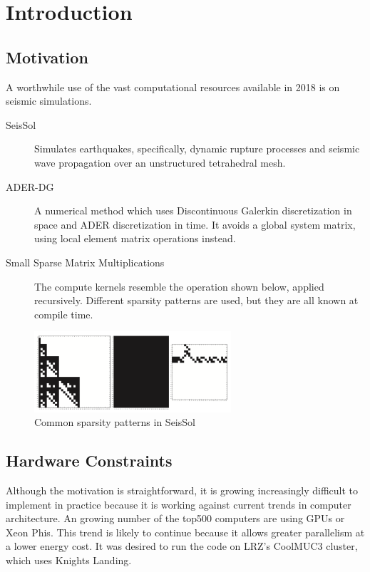 \chapter{Introduction}
\label{chapter:Introduction}


\section{Motivation}

A worthwhile use of the vast computational resources available in 2018 is on seismic simulations. 

\begin{description}
	\item[SeisSol]
    Simulates earthquakes, specifically, dynamic rupture processes and seismic wave propagation over an unstructured tetrahedral mesh. 

    \item[ADER-DG]
    A numerical method which uses Discontinuous Galerkin discretization in space and ADER discretization in time. It avoids a global system matrix, using local element matrix operations instead.

    \item[Small Sparse Matrix Multiplications]
    The compute kernels resemble the operation shown below, applied recursively. Different sparsity patterns are used, but they are all known at compile time.
\end{description}

\begin{figure}
  \centering
  \includegraphics[height=3cm]{images/seissol_visc.png}
  \caption{Common sparsity patterns in SeisSol}
  \label{fig:seissol_star}
\end{figure}

\section{Hardware Constraints}

Although the motivation is straightforward, it is growing increasingly difficult to implement in practice because it is working against current trends in computer architecture. An growing number of the top500 computers are using GPUs or Xeon Phis. This trend is likely to continue because it allows greater parallelism at a lower energy cost. It was desired to run the code on LRZ's CoolMUC3 cluster, which uses Knights Landing.

